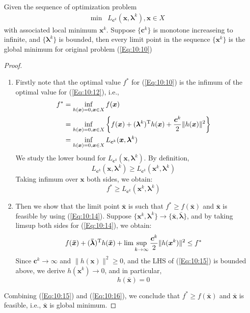 \begin{theorem}
Given the sequence of optimization problem
\begin{equation}\label{Eq:10:12}
\begin{array}{ll}
\min&L_{\bm c^k}(\bm x,\bm\lambda^k),\bm x\in X
\end{array}
\end{equation}
with associated local minimum $\bm x^k$. Suppose $\{\bm c^k\}$ is monotone increaseing to infinite, and $\{\bm\lambda^k\}$ is bounded, then every limit point in the sequence $\{\bm x^k\}$ is the global minimum for original problem (\ref{Eq:10:10})
\end{theorem}
\begin{proof}
\begin{enumerate}
\item
Firstly note that the optimal value $f^*$ for (\ref{Eq:10:10}) is the infimum of the optimal value for (\ref{Eq:10:12}), i.e., 
\begin{align*}
f^*&=\inf_{h(\bm x)=0,\bm x\in X}f(\bm x)\\
&=\inf_{h(\bm x)=0,\bm x\in X}\left\{
f(\bm x)+(\bm\lambda^k)^{\mathrm T} h(\bm x)+\frac{\bm c^k}{2}\|h(\bm x)\|^2
\right\}\\
&=\inf_{h(\bm x)=0,\bm x\in X}L_{\bm c^k}(\bm x,\bm\lambda^k)
\end{align*}
We study the lower bound for $L_{\bm c^k}(\bm x,\bm\lambda^k)$. By definition,
\begin{equation}
L_{\bm c^k}(\bm x,\bm\lambda^k)\ge L_{\bm c^k}(\bm x^k,\bm\lambda^k) 
\end{equation}
Taking infimum over $\bm x$ both sides, we obtain:
\begin{equation}\label{Eq:10:14}
f^*\ge L_{\bm c^k}(\bm x^k,\bm\lambda^k) 
\end{equation}
\item
Then we show that the limit point $\bm{\bar x}$ is such that $f^*\ge f(\bm{\bar x})$ and $\bm{\bar x}$ is feasible by using (\ref{Eq:10:14}). Suppose $\{\bm x^k,\bm\lambda^k\}\to\{\bm{\bar x},\bm{\bar\lambda}\}$, and by taking limsup both sides for (\ref{Eq:10:14}), we obtain:
\begin{equation}\label{Eq:10:15}
f(\bm{\bar x})+(\bm{\bar\lambda})\trans h(\bm{\bar x})+\lim\sup_{k\to\infty}\frac{\bm c^k}{2}\|h(\bm x^k)\|^2\le f^*
\end{equation}
Since $\bm c^k\to\infty$ and $\|h(\bm x)\|^2\ge0$, and the LHS of (\ref{Eq:10:15}) is bounded above, we derive $h(\bm x^k)\to0$, and in particular, 
\begin{equation}\label{Eq:10:16}
h(\bm{\bar x})=0
\end{equation}
\end{enumerate}
Combining (\ref{Eq:10:15}) and (\ref{Eq:10:16}), we conclude that $f^*\ge f(\bm{\bar x})$ and $\bm{\bar x}$ is feasible, i.e., $\bm{\bar x}$ is global minimum.
\end{proof}

